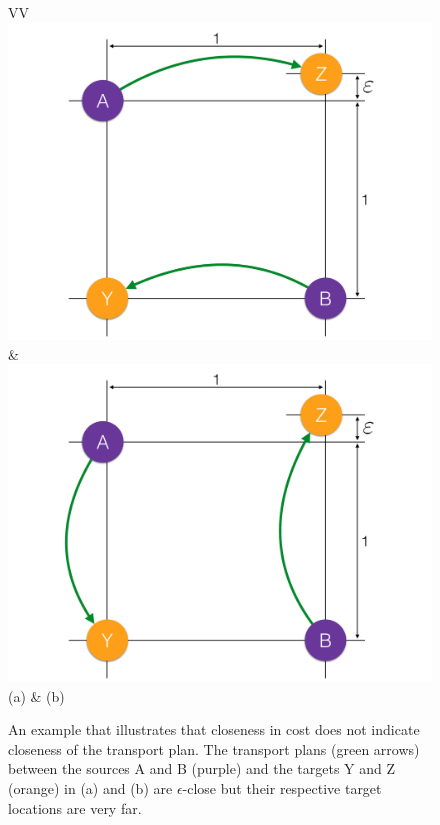 \documentclass[twoside,11pt]{article}
\begin{document}
\begin{figure}[thb]
\centering
\begin{tabular}{VV}
\includegraphics[width=0.99\linewidth]{counter-approximation} &
\includegraphics[width=0.99\linewidth]{counter-approximation2} \\
                      (a) & (b)  
\end{tabular}
  \vspace{-0.1in}
\caption{
\label{fig:counter-approximation}
An example that illustrates that closeness in cost does not indicate closeness
of the transport plan. The transport plans (green arrows) between the sources A
and B (purple) and the targets Y and Z (orange)  in (a) and (b) are
$\epsilon$-close but their respective target locations are very far.  } 
\end{figure}
\end{document}
